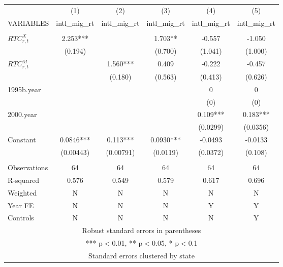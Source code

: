 \begin{tabular}{lccccc} \hline
 & (1) & (2) & (3) & (4) & (5) \\
VARIABLES & intl\_mig\_rt & intl\_mig\_rt & intl\_mig\_rt & intl\_mig\_rt & intl\_mig\_rt \\ \hline
 &  &  &  &  &  \\
$ RTC_{r,t}^X$ & 2.253*** &  & 1.703** & -0.557 & -1.050 \\
 & (0.194) &  & (0.700) & (1.041) & (1.000) \\
$ RTC_{r,t}^M$ &  & 1.560*** & 0.409 & -0.222 & -0.457 \\
 &  & (0.180) & (0.563) & (0.413) & (0.626) \\
1995b.year &  &  &  & 0 & 0 \\
 &  &  &  & (0) & (0) \\
2000.year &  &  &  & 0.109*** & 0.183*** \\
 &  &  &  & (0.0299) & (0.0356) \\
Constant & 0.0846*** & 0.113*** & 0.0930*** & -0.0493 & -0.0133 \\
 & (0.00443) & (0.00791) & (0.0119) & (0.0372) & (0.108) \\
 &  &  &  &  &  \\
Observations & 64 & 64 & 64 & 64 & 64 \\
R-squared & 0.576 & 0.549 & 0.579 & 0.617 & 0.696 \\
Weighted & N & N & N & N & N \\
Year FE & N & N & N & Y & Y \\
 Controls & N & N & N & N & Y \\ \hline
\multicolumn{6}{c}{ Robust standard errors in parentheses} \\
\multicolumn{6}{c}{ *** p$<$0.01, ** p$<$0.05, * p$<$0.1} \\
\multicolumn{6}{c}{ Standard errors clustered by state} \\
\end{tabular}
